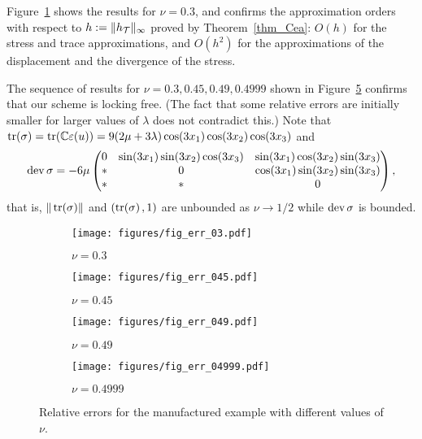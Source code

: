 \documentclass[11pt]{article}
\begin{document}
Figure~\ref{fig_a} shows the results for $\nu=0.3$, and confirms the
approximation orders with respect to $h:=\|h_{\mathcal{T}}\|_\infty$ proved by Theorem~\ref{thm_Cea}:
$O(h)$ for the stress and trace approximations, and $O(h^2)$ for the approximations
of the displacement and the divergence of the stress.

The sequence of results for $\nu=0.3,0.45,0.49,0.4999$ shown in Figure~\ref{fig}
confirms that our scheme is locking free.
(The fact that some relative errors are initially smaller for larger values of $\lambda$
does not contradict this.)
Note that $\operatorname{tr}(\sigma)=\operatorname{tr}(\mathbb{C}\varepsilon(u))=9(2\mu+3\lambda)\cos(3x_1)\cos(3x_2)\cos(3x_3)$ and
\[
   \operatorname{dev}\sigma
   =-6\mu\begin{pmatrix} 0 & \sin(3x_1)\sin(3x_2)\cos(3x_3) & \sin(3x_1)\cos(3x_2)\sin(3x_3)\\
                         * & 0 & \cos(3x_1)\sin(3x_2)\sin(3x_3)\\
                         * & * & 0
         \end{pmatrix},
\]
that is,
$\|\operatorname{tr}(\sigma)\|$ and $(\operatorname{tr}(\sigma)\hspace*{.5mm},1)$ are unbounded as $\nu\to 1/2$
while $\operatorname{dev}\sigma$ is bounded.

\begin{figure}[hb]
\centering
\begin{subfigure}{0.5\textwidth}
\texttt{[image: figures/fig\_err\_03.pdf]}
\caption{$\nu=0.3$}
\label{fig_a}
\end{subfigure}
\hspace{-2em}
\begin{subfigure}{0.5\textwidth}
\texttt{[image: figures/fig\_err\_045.pdf]}
\caption{$\nu=0.45$}
\label{fig_b}
\end{subfigure}

\begin{subfigure}{0.5\textwidth}
\texttt{[image: figures/fig\_err\_049.pdf]}
\caption{$\nu=0.49$}
\label{fig_c}
\end{subfigure}
\hspace{-2em}
\begin{subfigure}{0.5\textwidth}
\texttt{[image: figures/fig\_err\_04999.pdf]}
\caption{$\nu=0.4999$}
\label{fig_d}
\end{subfigure}

\caption{Relative errors for the manufactured example with different values of $\nu$.}
\label{fig}
\end{figure}

\clearpage


\end{document}
